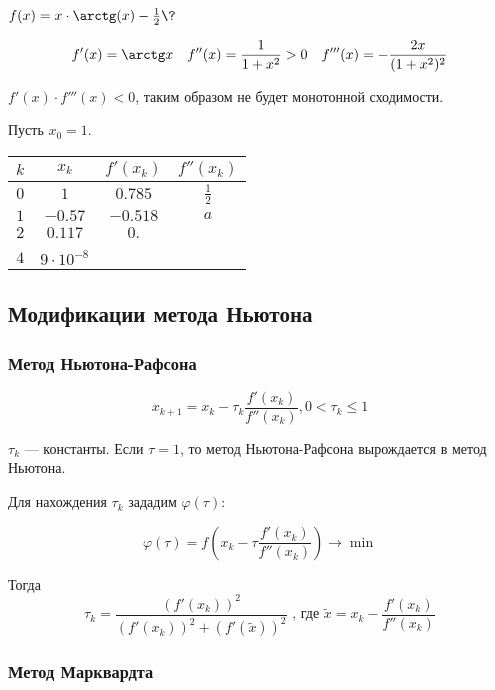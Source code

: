\begin{example}
    \(f(x) = x \cdot \arctg (x) - \frac{1}{2} \?\)

    \[f'(x) = \arctg x \quad f''(x) = \frac{1}{1 + x^2} > 0 \quad f'''(x) = - \frac{2x}{(1 + x^2)^2}\]

    \(f'(x) \cdot f'''(x) < 0\), таким образом не будет монотонной сходимости.

    Пусть \(x_0 = 1\).

    \begin{tabular}{c|c|c|c}
        \(k\) & \(x_k\)              & \(f'(x_k)\)  & \(f''(x_k)\)    \\ \hline
        \(0\) & \(1\)                & \(0.785\)    & \(\frac{1}{2}\) \\
        \(1\) & \( - 0.57\)          & \( - 0.518\) & \(a\)           \\
        \(2\) & \(0.117\)            & \( 0.\)      &                 \\
              &                      &              &                 \\
        \(4\) & \(9\cdot 10^{ - 8}\) &
    \end{tabular}
\end{example}

\subsection{Модификации метода Ньютона}

\subsubsection{Метод Ньютона-Рафсона}

\[x_{k+1} = x_k - \tau_k \frac{f'(x_k)}{f''(x_k)}, 0 < \tau_k \leq 1\]

\(\tau_k\) --- константы. Если \(\tau = 1\), то метод Ньютона-Рафсона вырождается в метод Ньютона.

Для нахождения \(\tau_k\) зададим \(\varphi(\tau)\):

\[\varphi(\tau) = f(x_k - \tau \frac{f'(x_k)}{f''(x_k)} ) \to \min\]

Тогда \[\tau_k = \frac{(f'(x_k))^2}{(f'(x_k))^2 + (f'(\tilde{x}))^2} \text{ , где } \tilde{x} = x_k - \frac{f'(x_k)}{f''(x_k)}  \]

\subsubsection{Метод Марквардта}

